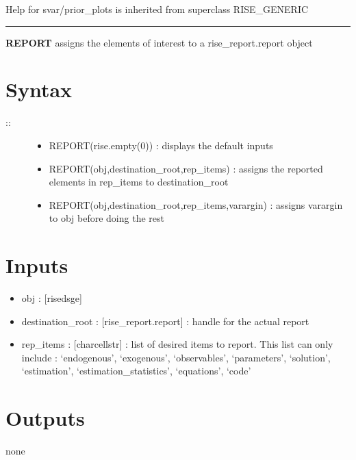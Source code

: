 \documentclass[letterpaper,10pt,english]{sphinxmanual}
\begin{document}
Help for svar/prior\_plots is inherited from superclass RISE\_GENERIC


\bigskip\hrule{}\bigskip

\label{classes/models/@svar/svar:report}
\textbf{REPORT} assigns the elements of interest to a rise\_report.report object


\section{Syntax}
\label{classes/models/@svar/svar:id94}\begin{description}
\item[{::}] \leavevmode\begin{itemize}
\item {} 
REPORT(rise.empty(0)) : displays the default inputs

\item {} 
REPORT(obj,destination\_root,rep\_items) : assigns the reported
elements in rep\_items to destination\_root

\item {} 
REPORT(obj,destination\_root,rep\_items,varargin) : assigns varargin to
obj before doing the rest

\end{itemize}

\end{description}


\section{Inputs}
\label{classes/models/@svar/svar:id95}\begin{itemize}
\item {} 
obj : {[}rise\textbar{}dsge{]}

\item {} 
destination\_root : {[}rise\_report.report{]} : handle for the actual report

\item {} 
rep\_items : {[}char\textbar{}cellstr{]} : list of desired items to report. This list
can only include : `endogenous', `exogenous', `observables',
`parameters', `solution', `estimation', `estimation\_statistics',
`equations', `code'

\end{itemize}


\section{Outputs}
\label{classes/models/@svar/svar:id96}
none
\end{document}
